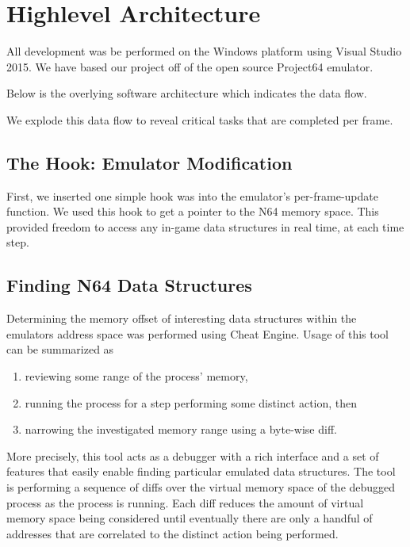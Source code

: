 \chapter*{Highlevel Architecture}

All development was be performed on the Windows platform using Visual Studio 2015.
We have based our project off of the open source Project64 emulator.

Below is the overlying software architecture which indicates the data flow.


We explode this data flow to reveal critical tasks that are completed per frame.


\section*{The Hook: Emulator Modification}
First, we inserted one simple hook was into the emulator's per-frame-update function. 
We used this hook to get a pointer to the N64 memory space. 
This provided freedom to access any in-game data structures in real time, at each time step. 

\section*{Finding N64 Data Structures}
Determining the memory offset of interesting data structures within the emulators address space was performed using Cheat Engine.
Usage of this tool can be summarized as 
\begin{enumerate}
\item reviewing some range of the process' memory,
\item  running the process for a step performing some distinct action, then
\item narrowing the investigated memory range using a byte-wise diff.
\end{enumerate}

More precisely, this tool acts as a debugger with a rich interface and a set of features that easily enable finding particular emulated data structures.
The tool is performing a sequence of diffs over the virtual memory space of the debugged process as the process is running.
Each diff reduces the amount of virtual memory space being considered until eventually there are only a handful of addresses that are correlated to the distinct action being performed.

